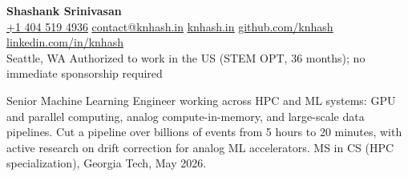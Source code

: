 \documentclass[letterpaper, 11pt]{article}
\let\oldhref\href
\renewcommand{\href}[2]{\oldhref{#1}{\uline{#2}}}
\newcommand{\contactsep}{\hspace{0.45em}\textbar\hspace{0.45em}}
\def\SummaryPara{Senior Machine Learning Engineer with 6 years building real-time recommendation and ranking systems. Served personalized content to \textbf{100M DAU} at \textbf{sub-50ms p99}, lifting \textbf{conversion +12\%} and engagement +5\%. MS in CS (HPC specialization), Georgia Tech, May 2026.}
\def\SummaryPara{Senior Machine Learning Engineer specializing in recommendations, candidate generation, retrieval, and ranking. Owned cold-start personalization for a \textbf{100M DAU} feed at \textbf{sub-50ms p99}, lifting \textbf{conversion +12\%}; designed bandit, Elo, and lookalike models for sparse users. MS in CS (HPC specialization), Georgia Tech, May 2026.}%
\def\SummaryPara{Senior Machine Learning Engineer focused on ML platform and systems: low-latency serving, feature stores, streaming, and MLOps. Built serving and retraining infrastructure delivering \textbf{100M DAU} at \textbf{sub-50ms p99}, and standardized deployment, on-call, and automated canary across the team. MS in CS (HPC specialization), Georgia Tech, May 2026.}%
\def\SummaryPara{Senior Machine Learning Engineer working across HPC and ML systems: GPU and parallel computing, analog compute-in-memory, and large-scale data pipelines. Cut a pipeline over billions of events from 5 hours to 20 minutes, with active research on drift correction for analog ML accelerators. MS in CS (HPC specialization), Georgia Tech, May 2026.}%
\begin{document}
\begin{center}
{\fontsize{24}{28}\selectfont\bfseries Shashank Srinivasan}\\[17pt]
\small
\href{tel:+14045194936}{+1 404 519 4936}\contactsep
\href{mailto:contact@knhash.in}{contact@knhash.in}\contactsep
\href{https://knhash.in}{knhash.in}\contactsep
\href{https://github.com/knhash}{github.com/knhash}\contactsep
\href{https://linkedin.com/in/knhash}{linkedin.com/in/knhash} \\
\vspace{5pt}
Seattle, WA \contactsep Authorized to work in the US (STEM OPT, 36 months); no immediate sponsorship required
\end{center}
\vspace{5pt}

\noindent \SummaryPara
\end{document}
